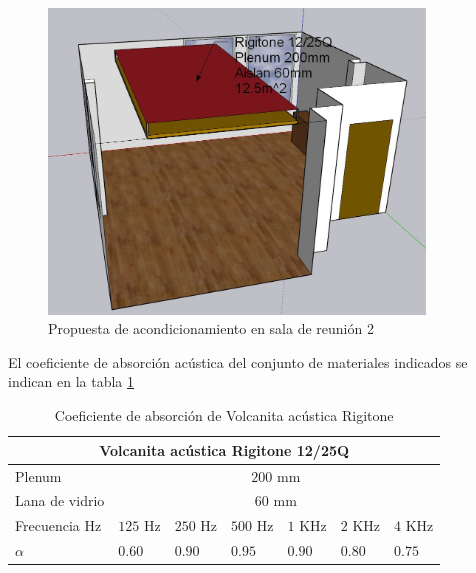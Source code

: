 \begin{figure}[H]
    \centering
    \includegraphics[width=10cm]{Imagenes/Propuesta/propuesta_reunion2.jpg}
    \caption{Propuesta de acondicionamiento en sala de reunión 2}
    \label{fig:propuesta_reunion2}
\end{figure}

El coeficiente de absorción acústica del conjunto de materiales indicados se indican en la tabla \ref{tab: coef abs volcanita Rigitone}
\begin{table}[H]
    \centering
    \begin{tabular}{|lllllll|}
    \hline
    \multicolumn{7}{|c|}{\textbf{Volcanita acústica Rigitone 12/25Q}} \\ \hline
    \multicolumn{1}{|l|}{Plenum} & \multicolumn{6}{c|}{$200$ mm} \\ \hline
    \multicolumn{1}{|l|}{Lana de vidrio} & \multicolumn{6}{c|}{$60$  mm} \\ \hline
    \multicolumn{1}{|l|}{Frecuencia Hz} & \multicolumn{1}{l|}{$125$ Hz} & \multicolumn{1}{l|}{$250$ Hz} & \multicolumn{1}{l|}{$500$ Hz} & \multicolumn{1}{l|}{$1$ KHz} & \multicolumn{1}{l|}{$2$ KHz} & $4$ KHz \\ \hline
    \multicolumn{1}{|l|}{$\alpha$} & \multicolumn{1}{l|}{$0.60$} & \multicolumn{1}{l|}{$0.90$} & \multicolumn{1}{l|}{$0.95$} & \multicolumn{1}{l|}{$0.90$} & \multicolumn{1}{l|}{$0.80$} & $0.75$ \\ \hline
    \end{tabular}
    \caption{Coeficiente de absorción de Volcanita acústica Rigitone}
    \label{tab: coef abs volcanita Rigitone}
\end{table}  

